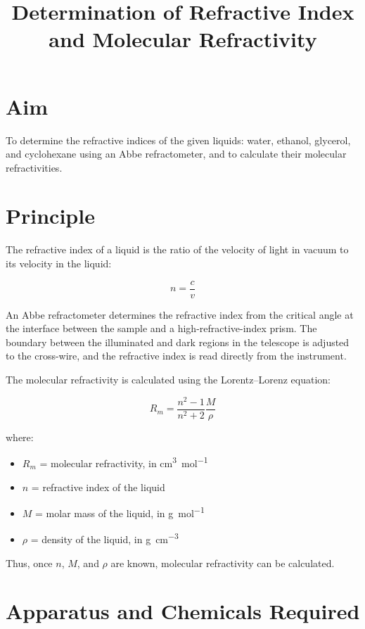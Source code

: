 \documentclass[12pt,a4paper]{article}
\title{\textbf{Determination of Refractive Index and Molecular Refractivity}}
\author{}
\date{}
\begin{document}
\maketitle

\section*{Aim}

To determine the refractive indices of the given liquids: water, ethanol, glycerol, and cyclohexane using an Abbe refractometer, and to calculate their molecular refractivities.

\section*{Principle}

The refractive index of a liquid is the ratio of the velocity of light in vacuum to its velocity in the liquid:

\[
n = \frac{c}{v}
\]

An Abbe refractometer determines the refractive index from the critical angle at the interface between the sample and a high-refractive-index prism. The boundary between the illuminated and dark regions in the telescope is adjusted to the cross-wire, and the refractive index is read directly from the instrument.

The molecular refractivity is calculated using the Lorentz--Lorenz equation:

\[
\boxed{
R_m =
\frac{n^2-1}{n^2+2}\frac{M}{\rho}
}
\]

where:
\begin{itemize}
    \item $R_m$ = molecular refractivity, in \si{\cubic\centi\metre\per\mole}
    \item $n$ = refractive index of the liquid
    \item $M$ = molar mass of the liquid, in \si{\gram\per\mole}
    \item $\rho$ = density of the liquid, in \si{\gram\per\cubic\centi\metre}
\end{itemize}

Thus, once $n$, $M$, and $\rho$ are known, molecular refractivity can be calculated.

\section*{Apparatus and Chemicals Required}
\end{document}
